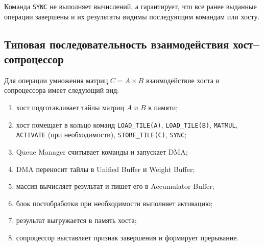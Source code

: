 \documentclass[12pt,a4paper]{article}
\begin{document}
Команда \texttt{SYNC} не выполняет вычислений, а гарантирует, что все ранее выданные операции завершены и их результаты видимы последующим командам или хосту.

\subsection{Типовая последовательность взаимодействия хост--сопроцессор}

Для операции умножения матриц \(C = A \times B\) взаимодействие хоста и сопроцессора имеет следующий вид:
\begin{enumerate}
    \item хост подготавливает тайлы матриц \(A\) и \(B\) в памяти;
    \item хост помещает в кольцо команд \texttt{LOAD\_TILE(A)}, \texttt{LOAD\_TILE(B)}, \texttt{MATMUL}, \texttt{ACTIVATE} (при необходимости), \texttt{STORE\_TILE(C)}, \texttt{SYNC};
    \item Queue Manager считывает команды и запускает DMA;
    \item DMA переносит тайлы в Unified Buffer и Weight Buffer;
    \item массив вычисляет результат и пишет его в Accumulator Buffer;
    \item блок постобработки при необходимости выполняет активацию;
    \item результат выгружается в память хоста;
    \item сопроцессор выставляет признак завершения и формирует прерывание.
\end{enumerate}
\end{document}
